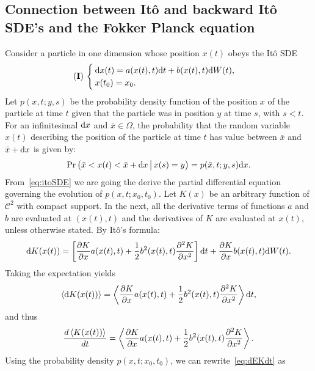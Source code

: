 \subsection{Connection between Itô and backward Itô SDE's and the Fokker Planck equation}
Consider a particle in one dimension whose position $x(t)$ obeys the Itô SDE
\begin{equation} \label{eq:itoSDE}
	\I\ 
	\begin{cases}
		\rm dx(t) = a(x(t),t) \rm dt + b(x(t),t) \rm dW(t),\\
		x(t_0) = x_0. 
	\end{cases}
\end{equation}
Let $p(x,t;y,s)$ be the probability density function of the position $x$ of the particle at time $t$ given that the particle was in position $y$ at time $s$, with $s < t$. For an infinitesimal $\rm dx$ and $\bar{x} \in \Omega$, the probability that the random variable $x(t)$ describing the position of the particle at time $t$ has value between $\bar{x}$ and $\bar{x}+\rm dx$ is given by:
\begin{equation}
	\Pr\big(\bar{x} < x(t) < \bar{x} + \rm dx \,\big|\, x(s) = y\big) = p(\bar{x},t;y,s)\rm dx.
\end{equation}
 From~\eqref{eq:itoSDE} we are going the derive the partial differential equation governing the evolution of $p(x,t;x_0,t_0)$. Let $K(x)$ be an arbitrary function of $\mathcal{C}^2$ with compact support. In the next, all the derivative terms of functions $a$ and $b$ are evaluated at $(x(t),t)$ and the derivatives of $K$ are evaluated at $x(t)$, unless otherwise stated. By Itô's formula:
\begin{equation}
	\rm dK(x(t)) = \left[\frac{\partial K}{\partial x} a(x(t),t) + \frac{1}{2}b^2(x(t),t) \frac{\partial^2 K}{\partial x^2} \right] \rm dt + \frac{\partial K}{\partial x}b(x(t),t) \rm dW(t).
\end{equation}
Taking the expectation yields
\begin{equation}
	\esp{\rm dK(x(t))} = \esp{\frac{\partial K}{\partial x} a(x(t),t) + \frac{1}{2}b^2(x(t),t) \frac{\partial^2 K}{\partial x^2}} \rm dt,
\end{equation}
and thus
\begin{equation} \label{eq:dEKdt}
	\frac{d\esp{K(x(t))}}{dt} = \esp{\frac{\partial K}{\partial x} a(x(t),t) + \frac{1}{2}b^2(x(t),t) \frac{\partial^2 K}{\partial x^2}}.
\end{equation}
Using the probability density $p(x,t;x_0,t_0)$, we can rewrite~\eqref{eq:dEKdt} as
